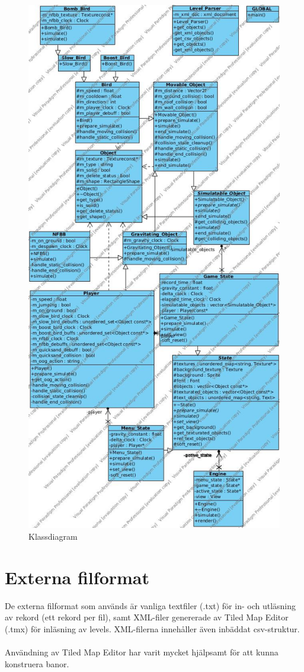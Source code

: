 \documentclass{TDP003mall}
\begin{document}
\begin{figure}[H]
    \centering
    \includegraphics[scale=0.5]{class_diagram}
    \caption{Klassdiagram}
    \label{Klassdiagram}
\end{figure}
\newpage
\section{Externa filformat}
De externa filformat som används är vanliga textfiler (.txt) för in- och utläsning av rekord (ett rekord per fil), samt XML-filer genererade av Tiled Map Editor (.tmx) för inläsning av levels. XML-filerna innehåller även inbäddat csv-struktur.
\\\\
Användning av Tiled Map Editor har varit mycket hjälpsamt för att kunna konstruera banor.
\end{document}

